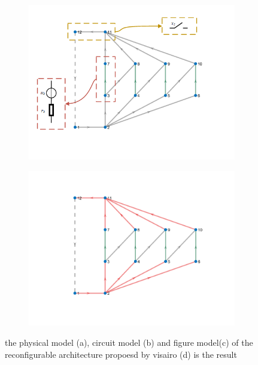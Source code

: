 \documentclass{article}
\begin{document}
\begin{figure}[htbp]
\begin{subfigure}[b]{0.45\textwidth}
    \includegraphics[width=\textwidth]{../attachments/f-dege-4-modify.png}
    \caption{}
    \label{fig:f4-circ}
  \end{subfigure}
  \hspace{0.05\textwidth}
  \begin{subfigure}[b]{0.45\textwidth}
    \includegraphics[width=\textwidth]{../attachments/f-dege-mac-4.png}
    \caption{}
    \label{fig:f4-mac}
  \end{subfigure}
    
  \caption{the physical model (a), circuit model (b) and figure model(c) of the reconfigurable architecture propoesd by visairo \cite{visairoReconfigurableBatteryPack2008}(d) is the result}
  \label{fig:f4-all}
\end{figure}
\end{document}
